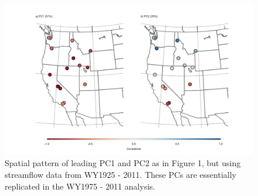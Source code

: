 \documentclass[final, double]{ua-thesis}
\begin{document}







\begin{figure}[ht]
\centering
\centerline{\includegraphics[width=190mm]{p1figures/s1.pdf}}
\caption{Spatial pattern of leading PC1 and PC2 as in Figure 1, but using streamflow data from WY1925 - 2011. These PCs are essentially replicated in the WY1975 - 2011 analysis.}
\label{sfig:eofs1925}
\end{figure}
\end{document}
